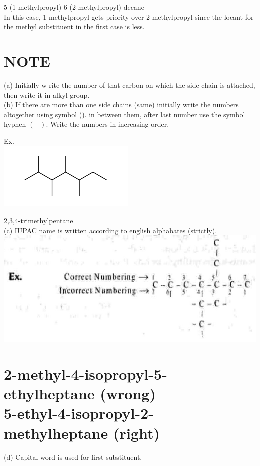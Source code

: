 \documentclass[10pt]{article}
\begin{document}
5-(1-methylpropyl)-6-(2-methylpropyl) decane\\
In this case, 1-methylpropyl gets priority over 2-methylpropyl since the locant for the methyl substituent in the first case is less.

\section*{NOTE}
(a) Initially w rite the number of that carbon on which the side chain is attached, then write it in alkyl group.\\
(b) If there are more than one side chains (same) initially write the numbers altogether using symbol (). in between them, after last number use the symbol hyphen $(-)$. Write the numbers in increasing order.

Ex.\\
\includegraphics{smile-242bf84f71365b6c75a4652604fd62e4201b762e}

2,3,4-trimethylpentane\\
(c) IUPAC name is written according to english alphabates (strictly).\\
\includegraphics[max width=\textwidth, center]{2025_01_28_8470952b98110cec3aabg-021(1)}

\section*{2-methyl-4-isopropyl-5-ethylheptane (wrong) \\
 5-ethyl-4-isopropyl-2-methylheptane (right)}
(d) Capital word is used for first substituent.
\end{document}
